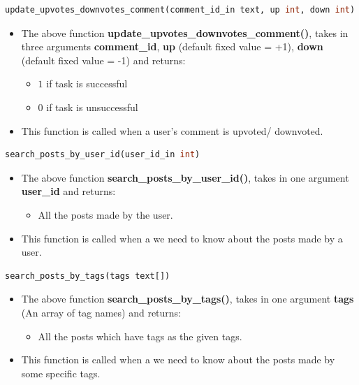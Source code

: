\documentclass[12pt,a4paper]{article}
\begin{document}
		\begin{lstlisting}[language=SQL, style = mystyle]
	update_upvotes_downvotes_comment(comment_id_in text, up int, down int)
\end{lstlisting}
\begin{itemize}
	\item The above function \textbf{update\_upvotes\_downvotes\_comment()}, takes in three arguments \textbf{comment\_id}, \textbf{up} (default fixed value = +1), \textbf{down} (default fixed value = -1) and returns:
	\begin{itemize}
		\item $1$ if task is successful
		\item $0$ if task is unsuccessful
	\end{itemize}
	\item This function is called when a user's comment is upvoted/ downvoted.
\end{itemize}

		\begin{lstlisting}[language=SQL, style = mystyle]
search_posts_by_user_id(user_id_in int)
\end{lstlisting}
\begin{itemize}
	\item The above function \textbf{search\_posts\_by\_user\_id()}, takes in one argument \textbf{user\_id} and returns:
	\begin{itemize}
		\item All the posts made by the user.
	\end{itemize}
	\item This function is called when a we need to know about the posts made by a user.
\end{itemize}

		\begin{lstlisting}[language=SQL, style = mystyle]
search_posts_by_tags(tags text[])
\end{lstlisting}
\begin{itemize}
	\item The above function \textbf{search\_posts\_by\_tags()}, takes in one argument \textbf{tags} (An array of tag names) and returns:
	\begin{itemize}
		\item All the posts which have tags as the given tags.
	\end{itemize}
	\item This function is called when a we need to know about the posts made by some specific tags.
\end{itemize}
\end{document}
